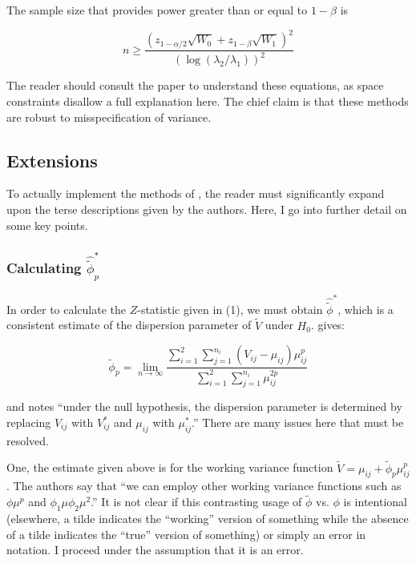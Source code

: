 \documentclass{article}
\begin{document}
 The sample size that provides power greater than or equal to $1 - \beta$ is

\begin{equation}
	n \geq \frac{(z_{1 - \alpha / 2} \sqrt{W_0} + z_{1 - \beta}
	\sqrt{W_1})^2}{\left( \log (\lambda_2 / \lambda_1 ) \right)^2}
\end{equation}

The reader should consult the paper to understand these equations, as
space constraints disallow a full explanation here. The chief claim
is that these methods are robust to misspecification of variance.

\subsection{Extensions}

To actually implement the methods of \cite{igeta2018}, 
the reader must significantly expand upon the terse descriptions
given by the authors. Here, I go into further detail on some key points.

\subsubsection{Calculating $\hat{\tilde{\phi}}_p^*$}

In order to calculate the $Z$-statistic given in (1), we must obtain
$\hat{\tilde{\phi}}^*$, which is a consistent estimate of the dispersion
parameter of $\tilde{V}$ under $H_0$. \cite{igeta2018} gives:

\begin{equation}
	\tilde{\phi}_p = \lim_{n \to \infty} \frac{\sum_{i=1}^2
	\sum_{j=1}^{n_i}(V_{ij} - \mu_{ij})\mu_{ij}^{p}}{\sum_{i=1}^{2}
	\sum_{j=1}^{n_i}\mu_{ij}^{2p}}
\end{equation}

and notes ``under the null hypothesis, the dispersion parameter is determined by
replacing $V_{ij}$ with $V_{ij}^*$ and $\mu_{ij}$ with $\mu_{ij}^*$.'' There are
many issues here that must be resolved.

One, the estimate given above is for the working variance function $\tilde{V} = \mu_{ij} + \tilde{\phi}_p
\mu_{ij}^p$. The authors say that ``we can employ other working variance
functions such as  $\phi \mu^p$ and $\phi_1 \mu \phi_2 \mu^2$.'' It is not clear
if this contrasting usage of $\tilde{\phi}$ vs. $\phi$ is intentional 
(elsewhere, a tilde indicates the ``working'' version of
something while the absence of a tilde indicates the ``true'' version of
something) or simply an error in notation. I proceed under the assumption that
it is an error.
\end{document}
